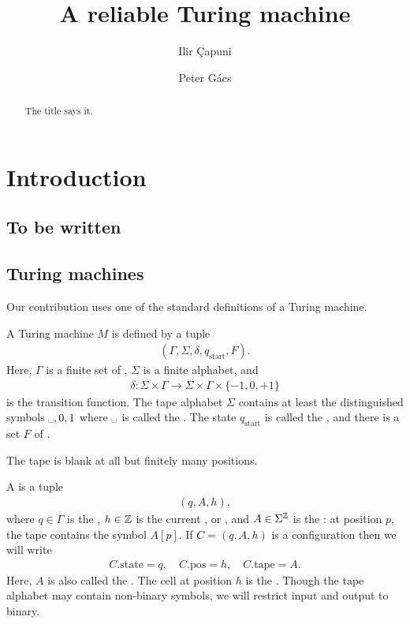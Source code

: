 \documentclass[12pt]{memoir}
\newcommand{\blank}{\text{\textvisiblespace}}
\newcommand{\h}{h}
\newcommand{\pos}{\mathrm{pos}}
\newcommand{\start}{\mathrm{start}}
\newcommand{\state}{\mathrm{state}}
\newcommand{\tape}{\mathrm{tape}}
\begin{document}
\title{A reliable Turing machine}

\author{Ilir \c{C}apuni \and Peter G\'acs}

\maketitle
\thispagestyle{empty}

\begin{abstract}
The title says it.
\end{abstract}

\section{Introduction}

\subsection{To be written}

\subsection{Turing machines}\label{sec:TM}

Our contribution uses one of the standard definitions of a Turing
machine.

    A Turing machine \( M \) is defined by a tuple
        \begin{align*}
             (\Gamma, \Sigma,\delta, q_{\start},F).
        \end{align*}
    Here, \( \Gamma \) is a finite set of ,
    \( \Sigma \) is a finite alphabet, and
        \begin{align*}
             \delta\colon\Sigma\times \Gamma\to \Sigma\times\Gamma\times\{-1,0,+1\}
        \end{align*}
    is the transition function.
The tape alphabet \( \Sigma \) contains at least the distinguished
symbols \( \blank,0,1 \) where \( \blank \) is called the .
The state \( q_{\start} \) is called the , and
there is a set \( F \) of .

    The tape is blank at all but finitely many positions.

    A  is a tuple
        \begin{align*}
             (q,A,\h),
        \end{align*}
    where \( q\in\Gamma \) is the , 
\( \h\in\bbZ \) is the current , or ,
and \( A\in\Sigma^{\mathbb{Z}} \) is the : 
at position \( p \), the tape contains the symbol \( A[p] \).
If \( C=(q,A,\h) \) is a configuration then we will write
        \begin{align*}
             C.\state=q,\quad C.\pos=\h, \quad C.\tape=A.
        \end{align*}
    Here, \( A \) is also called the .
    The cell at position \( \h \) is the  .
Though the tape alphabet may contain
non-binary symbols, we will restrict input and output to binary.
\end{document}
